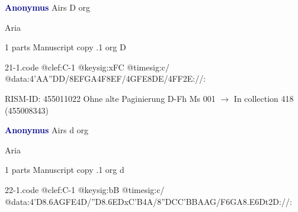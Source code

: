 \documentclass[twocolumn]{book}
\begin{document}
\newline \par \vspace{7pt} \textcolor{darkblue}{\textbf{Anonymus  }}
\newline Airs  D  
\newline org
\newline \begin{itshape}[f.116r, heading:] Aria\end{itshape} 
\newline \textcolor{darkblue}{}  1 parts  
\newline Manuscript copy
.1  org  D  
\begin{filecontents*}{21-1.code}
@clef:C-1
@keysig:xFC
@timesig:c/
@data:4'AA''DD/{8EFGA}4F{8EF}/4GFE{8DE}/4FF2E://:
\end{filecontents*}
\newline
%

\newline RISM-ID: 455011022
\newline Ohne alte Paginierung
\newline D-Fh  Ms 001
\newline $\rightarrow$ In collection 418 (455008343)

\newline \par \vspace{7pt} \textcolor{darkblue}{\textbf{Anonymus  }}
\newline Airs  d  
\newline org
\newline \begin{itshape}[f.116v, heading:] Aria\end{itshape} 
\newline \textcolor{darkblue}{}  1 parts  
\newline Manuscript copy
.1  org  d  
\begin{filecontents*}{22-1.code}
@clef:C-1
@keysig:bB
@timesig:c/
@data:4'D{8.6AG}{FE}4D/''D{8.6ED}{xC'B}4A/{8''DC}{C'B}{BA}{AG}/{F6GA}{8.E6Dt}2D://:
\end{filecontents*}
\newline
%
\end{document}
